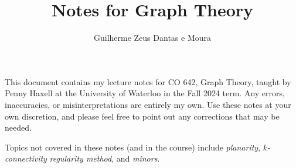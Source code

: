 \documentclass{scrbook}
\title{Notes for Graph Theory}
\author{Guilherme Zeus Dantas e Moura}
\theoremstyle{definition}
\begin{document}
	\maketitle

    This document contains my lecture notes for CO 642, Graph Theory, taught by Penny Haxell at the University of Waterloo in the Fall 2024 term.
    Any errors, inaccuracies, or misinterpretations are entirely my own.
    Use these notes at your own discretion, and please feel free to point out any corrections that may be needed.
    
    Topics not covered in these notes (and in the course) include
    \emph{planarity},
    \emph{\(k\)-connectivity}
    \emph{regularity method},
    and \emph{minors}.
    
    \tableofcontents

    
    
    

    \printbibliography
\end{document}
